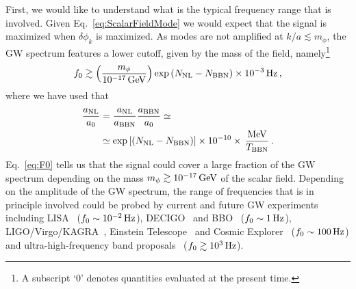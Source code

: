 \documentclass[a4paper, amsfonts, amssymb, amsmath, reprint, showkeys, nofootinbib, twoside, superscriptaddress]{revtex4-1}
\begin{document}
First, we would like to understand what is the typical frequency range that is involved. Given Eq.~\eqref{eq:ScalarFieldMode} we would expect that the signal is maximized when $\delta\phi_k$ is maximized. As modes are not amplified at $k/a \lesssim m_\phi$, the GW spectrum features a lower cutoff, given by the mass of the field, namely\footnote{A subscript ‘0’ denotes quantities evaluated at the present time.}
\begin{align}
\label{eq:F0}
f_0 \gtrsim \left(\frac{m_\phi}{10^{-17} \, \rm GeV}\right) \exp\left(N_{\rm NL} - N_{\rm BBN}\right) \times 10^{-3} \, \rm{Hz} \,,
\end{align}
where we have used that
\begin{align}
\label{eq:apa0}
\frac{a_{\rm NL}}{a_0} &= \frac{a_{\rm NL}}{a_{\rm BBN}} \frac{a_{\rm BBN}}{a_{\rm 0}} \simeq \\
&\simeq \exp\left[(N_{\rm NL} - N_{\rm BBN})\right] \times 10^{-10} \times \, \frac{\text{MeV}}{T_{\rm BBN}} \,. \nonumber
\end{align}
Eq.~\eqref{eq:F0} tells us that the signal could cover a large fraction of the GW spectrum depending on the mass $m_\phi \gtrsim 10^{-17} \, \rm{GeV}$ of the scalar field. Depending on the amplitude of the GW spectrum, the range of frequencies that is in principle involved could be probed by current and future GW experiments including LISA~\cite{amaroseoane2017laser, Barausse:2020rsu} ($f_0 \sim 10^{-2} \, \rm{Hz}$), DECIGO~\cite{Seto:2001qf} and BBO~\cite{Yagi:2011wg} ($f_0 \sim 1 \, \rm{Hz}$), LIGO/Virgo/KAGRA~\cite{KAGRA:2021kbb}, Einstein Telescope~\cite{Maggiore:2019uih} and Cosmic Explorer~\cite{Evans:2021gyd} ($f_0 \sim 100 \, \rm{Hz}$) and ultra-high-frequency band proposals~\cite{Aggarwal:2020olq} ($f_0 \gtrsim 10^3 \, \rm{Hz}$).\\
\end{document}
